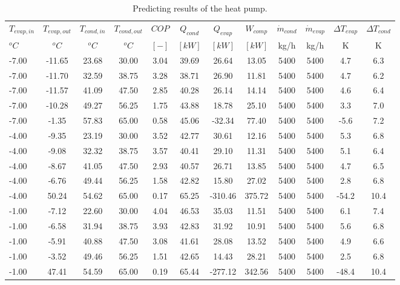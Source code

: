 \documentclass[english]{SPFShortReport}
\begin{document}
\begin{table}[!ht]
\begin{small}
\caption{Predicting results of the heat pump.}
\begin{center}
\resizebox{12cm}{!} 
{
\begin{tabular}{l | c c c c c c c c c c c } 
\hline
\hline
$T_{evap,in}$ &$T_{evap,out}$ &$T_{cond,in}$ &$T_{cond,out}$ &$COP$ &$Q_{cond}$ &$Q_{evap}$ &$W_{comp}$ &$\dot m_{cond}$ &$\dot m_{evap}$ &$\Delta T_{evap}$ &$\Delta T_{cond}$ \\ 
$^oC$ &$^oC$ &$^oC$ &$^oC$ &$[-]$ &$[kW]$ &$[kW]$ &$[kW]$ &kg/h &kg/h &K &K\\ 
\hline
-7.00 & -11.65 & 23.68 & 30.00 & 3.04 & 39.69 & 26.64 & 13.05 & 5400 & 5400 & 4.7 & 6.3\\ 
-7.00 & -11.70 & 32.59 & 38.75 & 3.28 & 38.71 & 26.90 & 11.81 & 5400 & 5400 & 4.7 & 6.2\\ 
-7.00 & -11.57 & 41.09 & 47.50 & 2.85 & 40.28 & 26.14 & 14.14 & 5400 & 5400 & 4.6 & 6.4\\ 
-7.00 & -10.28 & 49.27 & 56.25 & 1.75 & 43.88 & 18.78 & 25.10 & 5400 & 5400 & 3.3 & 7.0\\ 
-7.00 & -1.35 & 57.83 & 65.00 & 0.58 & 45.06 & -32.34 & 77.40 & 5400 & 5400 & -5.6 & 7.2\\ 
-4.00 & -9.35 & 23.19 & 30.00 & 3.52 & 42.77 & 30.61 & 12.16 & 5400 & 5400 & 5.3 & 6.8\\ 
-4.00 & -9.08 & 32.32 & 38.75 & 3.57 & 40.41 & 29.10 & 11.31 & 5400 & 5400 & 5.1 & 6.4\\ 
-4.00 & -8.67 & 41.05 & 47.50 & 2.93 & 40.57 & 26.71 & 13.85 & 5400 & 5400 & 4.7 & 6.5\\ 
-4.00 & -6.76 & 49.44 & 56.25 & 1.58 & 42.82 & 15.80 & 27.02 & 5400 & 5400 & 2.8 & 6.8\\ 
-4.00 & 50.24 & 54.62 & 65.00 & 0.17 & 65.25 & -310.46 & 375.72 & 5400 & 5400 & -54.2 & 10.4\\ 
-1.00 & -7.12 & 22.60 & 30.00 & 4.04 & 46.53 & 35.03 & 11.51 & 5400 & 5400 & 6.1 & 7.4\\ 
-1.00 & -6.58 & 31.94 & 38.75 & 3.93 & 42.83 & 31.92 & 10.91 & 5400 & 5400 & 5.6 & 6.8\\ 
-1.00 & -5.91 & 40.88 & 47.50 & 3.08 & 41.61 & 28.08 & 13.52 & 5400 & 5400 & 4.9 & 6.6\\ 
-1.00 & -3.52 & 49.46 & 56.25 & 1.51 & 42.65 & 14.43 & 28.21 & 5400 & 5400 & 2.5 & 6.8\\ 
-1.00 & 47.41 & 54.59 & 65.00 & 0.19 & 65.44 & -277.12 & 342.56 & 5400 & 5400 & -48.4 & 10.4\\ 

\end{tabular}}
\end{center}
\end{small}
\end{table}
\end{document}
